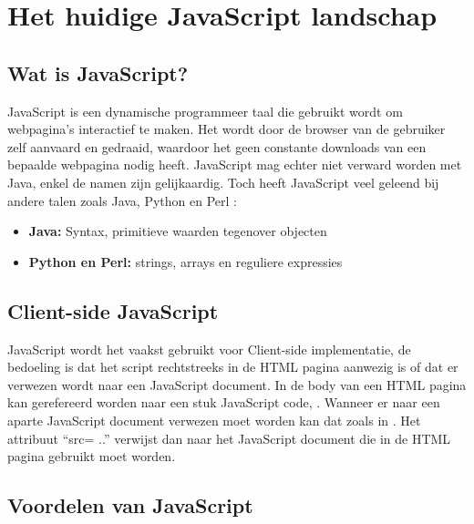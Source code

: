 \chapter{Het huidige JavaScript landschap}\label{ch:javascriptland}

\section{Wat is JavaScript?}\label{sec:JavaScript}

JavaScript is een dynamische programmeer taal die gebruikt wordt om webpagina's interactief te maken. Het wordt door de browser van de gebruiker zelf aanvaard en gedraaid, waardoor het geen constante downloads van een bepaalde webpagina nodig heeft. 
JavaScript mag echter niet verward worden met Java, enkel de namen zijn gelijkaardig. Toch heeft JavaScript veel geleend bij andere talen zoals Java, Python en Perl : 
	\begin{itemize}
		\item \textbf{Java:} Syntax, primitieve waarden tegenover objecten
		\item \textbf{Python en Perl:} strings, arrays en reguliere expressies
	\end{itemize}
\section{Client-side JavaScript}\label{sec:csjs}
JavaScript wordt het vaakst gebruikt voor Client-side implementatie, de bedoeling is dat het script rechtstreeks in de HTML pagina aanwezig is of dat er verwezen wordt naar een JavaScript document.
In de body van een HTML pagina kan gerefereerd worden naar een stuk JavaScript code, .
	Wanneer er naar een aparte JavaScript document verwezen moet worden kan dat zoals in . Het attribuut “src= ..” verwijst dan naar het JavaScript document die in de HTML pagina gebruikt moet worden.   
	\section{Voordelen van JavaScript}
	
